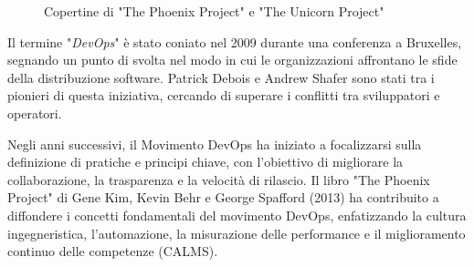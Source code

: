 \begin{figure}[h]
    \centering
    \hspace{30px}
    \caption{Copertine di "The Phoenix Project" e "The Unicorn Project"}
    \label{fig:cha1:jerez}
\end{figure}

Il termine "{\em DevOps}" è stato coniato nel 2009 durante una conferenza a Bruxelles, segnando un punto di svolta nel modo in cui le organizzazioni affrontano le sfide della distribuzione software. Patrick Debois e Andrew Shafer sono stati tra i pionieri di questa iniziativa, cercando di superare i conflitti tra sviluppatori e operatori.

Negli anni successivi, il Movimento DevOps ha iniziato a focalizzarsi sulla definizione di pratiche e principi chiave, con l'obiettivo di migliorare la collaborazione, la trasparenza e la velocità di rilascio. Il libro "The Phoenix Project" \cite{phoenix} di Gene Kim, Kevin Behr e George Spafford (2013) ha contribuito a diffondere i concetti fondamentali del movimento DevOps, enfatizzando la cultura ingegneristica, l'automazione, la misurazione delle performance e il miglioramento continuo delle competenze (CALMS).

